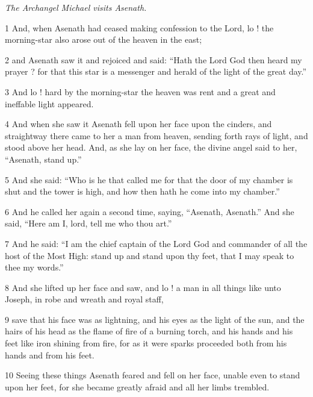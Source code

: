 \par \textit{The Archangel Michael visits Asenath.}

\par 1 And, when Asenath had ceased making confession to the Lord, lo ! the morning-star also arose out of the heaven in the east; 

\par 2 and Asenath saw it and rejoiced and said: “Hath the Lord God then heard my prayer ? for that this star is a messenger and herald of the light of the great day.” 

\par 3 And lo ! hard by the morning-star the heaven was rent and a great and ineffable light appeared. 

\par 4 And when she saw it Asenath fell upon her face upon the cinders, and straightway there came to her a man from heaven, sending forth rays of light, and stood above her head. And, as she lay on her face, the divine angel said to her, “Asenath, stand up.” 

\par 5 And she said: “Who is he that called me for that the door of my chamber is shut and the tower is high, and how then hath he come into my chamber.” 

\par 6 And he called her again a second time, saying, “Asenath, Asenath.” And she said, “Here am I, lord, tell me who thou art.” 

\par 7 And he said: “I am the chief captain of the Lord God and commander of all the host of the Most High: stand up and stand upon thy feet, that I may speak to thee my words.” 

\par 8 And she lifted up her face and saw, and lo ! a man in all things like unto Joseph, in robe and wreath and royal staff, 

\par 9 save that his face was as lightning, and his eyes as the light of the sun, and the hairs of his head as the flame of fire of a burning torch, and his hands and his feet like iron shining from fire, for as it were sparks proceeded both from his hands and from his feet. 

\par 10 Seeing these things Asenath feared and fell on her face, unable even to stand upon her feet, for she became greatly afraid and all her limbs trembled. 

